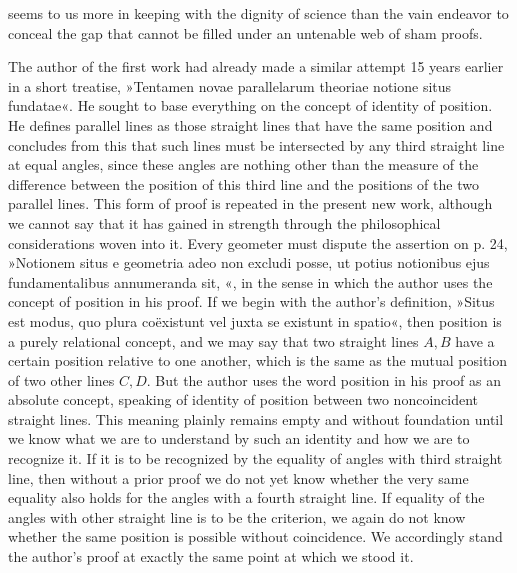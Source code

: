 seems to us more in keeping with the dignity of science than the vain
endeavor to conceal the gap that cannot be filled under an untenable web
of sham proofs.

The author of the first work had already made a similar attempt 15 years earlier in a short
treatise, »Tentamen novae parallelarum theoriae notione situs fundatae«.
He sought to base everything on the concept of identity
of position. He defines parallel lines as those
straight lines that have the same position and concludes from this that such lines
must be intersected by any third straight line at equal
angles, since these angles are nothing other
than the measure of the difference between the position of this third line and the
positions of the two parallel lines. This form of proof is repeated in the present new
work, although we cannot say that it has gained in strength through the
philosophical considerations woven into it. Every geometer must
dispute the assertion on p. 24, »Notionem situs e geometria adeo non excludi posse, ut potius
notionibus ejus fundamentalibus annumeranda sit, «, in the sense in which the author uses the concept of position in his
proof. If we begin with the
author's definition, »Situs est modus, quo plura coëxistunt vel juxta se
existunt in spatio«, then position is a purely relational concept, and we
may say that two straight lines $A,B$ have a certain position relative to one another,
which is the same as the mutual position of two other lines $C,D$. But the
author uses the word position in his proof as an absolute concept, speaking
of identity of position between two noncoincident straight lines. This
meaning plainly remains empty and without foundation until we know what
we are to understand by such an identity and how we are to recognize
it. If it is to be recognized by the equality of angles with  third
straight line, then without a prior proof we do
not yet know whether the very same equality also holds for the angles with a fourth straight
line. If equality of the angles with  other straight line is to be the criterion, we again do not know whether
the same position is possible without coincidence. We accordingly stand
 the author's proof at exactly the same point at which we stood
 it.


